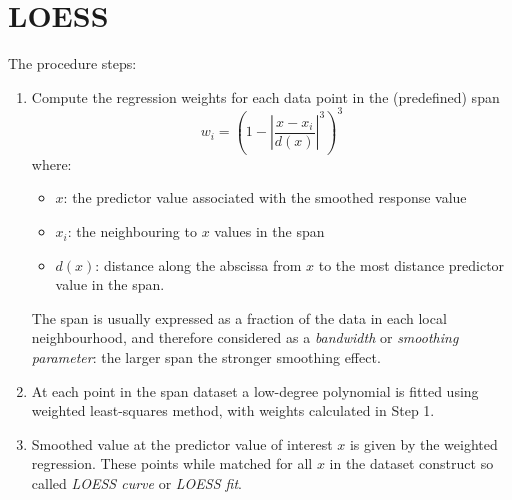 \section{LOESS}
\label{Appendix_LOESS}

The procedure steps:
\begin{enumerate}
	\item Compute the regression weights for each data point in the (predefined) span
	      \begin{equation}
	      	w_{i}=\left(1-\left|\frac{x-x_{i}}{d(x)}\right|^{3}\right)^{3}
	      \end{equation}
	      where:
	      \begin{itemize}
	      	\item $x$: the predictor value associated with the smoothed response value
	      	\item $x_{i}$: the neighbouring to $x$ values in the span
	      	\item $d(x)$: distance along the abscissa from $x$ to the most distance predictor value in the span.
	      \end{itemize}
	      The span is usually expressed as a fraction of the data in each local neighbourhood, and therefore considered as a \textit{bandwidth} or  \textit{smoothing parameter}: the larger span the stronger smoothing effect.
	\item At each point in the span dataset a low-degree polynomial is fitted using weighted least-squares method, with weights calculated in Step 1.
	\item Smoothed value at the predictor value of interest $x$ is given by the weighted regression.
	      These points while matched for all $x$ in the dataset construct so called \textit{LOESS curve} or \textit{LOESS fit}.
\end{enumerate}

